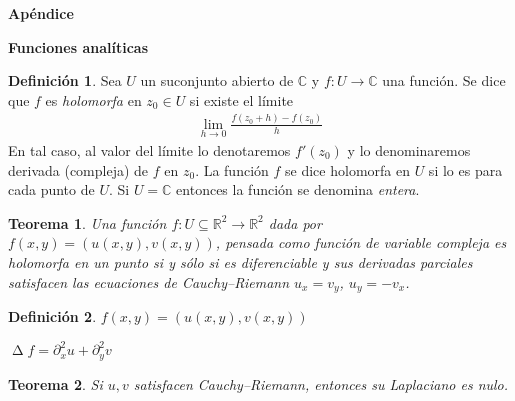 \documentclass{article}
\newcommand{\realNumbers}{\mathbb{R}}
\newcommand{\complexNumbers}{\mathbb{C}}
\DeclareMathOperator{\laplacian}{\Delta}
\theoremstyle{plain}
\newtheorem{theorem}{Teorema}
\theoremstyle{remark}
\theoremstyle{definition}
\newtheorem{definition}{Definición}
\begin{document}

\newpage
{\huge \textbf{Apéndice}}



\textbf{Funciones analíticas}
\begin{definition}
  Sea \(U\) un suconjunto abierto de \(\complexNumbers\) y \(f : U \rightarrow \complexNumbers\) una función.
  Se dice que \(f\) es \emph{holomorfa} en \(z_0 \in U\) si existe el límite
  \begin{align}
    \lim_{h \rightarrow 0} \frac{f(z_0 + h) - f(z_0)}{h}
  \end{align}
  En tal caso, al valor del límite lo denotaremos \(f'(z_0)\) y lo denominaremos derivada (compleja) de \(f\) en \(z_0\).
  La función \(f\) se dice holomorfa en \(U\) si lo es para cada punto de \(U\).
  Si \(U = \complexNumbers\) entonces la función se denomina \emph{entera}.
\end{definition}

\begin{theorem}
  Una función \(f : U \subseteq \realNumbers^2 \rightarrow \realNumbers^2\) dada por  \(f(x, y) = (u(x, y), v(x, y))\), pensada como función de variable compleja es holomorfa en un punto si y sólo si es diferenciable y sus derivadas parciales satisfacen las ecuaciones de Cauchy--Riemann \(u_x = v_y\), \(u_y = - v_x\).
\end{theorem}


\begin{definition}
  \(f(x, y) = (u(x, y), v(x, y))\)

  \(\laplacian f = \partial_x^2 u + \partial_y^2 v\)
\end{definition}

\begin{theorem}
  Si \(u, v\) satisfacen Cauchy--Riemann, entonces su Laplaciano es nulo.
\end{theorem}


\end{document}
